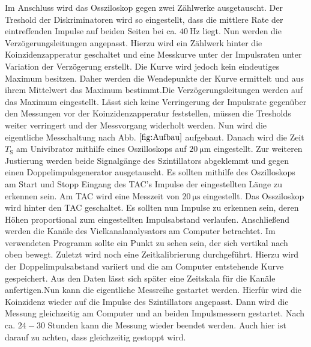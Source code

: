  Im Anschluss wird das Ossziloskop gegen zwei Zählwerke ausgetauscht. Der Treshold der Diskriminatoren wird so eingestellt, dass die mittlere Rate der eintreffenden Impulse auf beiden Seiten bei ca. $\SI{40}{\hertz}$ liegt. Nun werden die Verzögerungsleitungen angepasst. Hierzu wird ein Zählwerk hinter die Koinzidenzapperatur geschaltet und eine Messkurve unter der Impulsraten unter Variation der Verzögerung erstellt. Die Kurve wird jedoch kein eindeutiges Maximum besitzen. Daher werden die Wendepunkte der Kurve ermittelt und aus ihrem Mittelwert das Maximum bestimmt.Die Verzögerungsleitungen werden auf das Maximum eingestellt. Lässt sich keine Verringerung der Impulsrate gegenüber den Messungen vor der Koinzidenzapperatur feststellen, müssen die Tresholds weiter verringert und der Messvorgang widerholt werden. Nun wird die eigentliche Messchaltung nach Abb. $\ref{fig:Aufbau}$ aufgebaut. Danach wird die Zeit $T_\text{S}$ am Univibrator mithilfe eines Oszilloskops auf $\SI{20}{\micro\meter}$ eingestellt. Zur weiteren Justierung werden beide Signalgänge des Szintillators abgeklemmt und gegen einen Doppelimpulsgenerator ausgetauscht. Es sollten mithilfe des Oszilloskops am Start und Stopp Eingang des TAC's Impulse der eingestellten Länge zu erkennen sein. Am TAC wird eine Messzeit von $\SI{20}{\micro\second}$ eingestellt. Das Ossziloskop wird hinter den TAC geschaltet. Es sollten nun Impulse zu erkennen sein, deren Höhen proportional zum eingestellten Impulsabstand verlaufen. Anschließend werden die Kanäle des Vielkanalanalysators am Computer betrachtet. Im verwendeten Programm sollte  ein Punkt zu sehen sein, der sich vertikal nach oben bewegt. Zuletzt wird noch eine Zeitkalibrierung durchgeführt. Hierzu wird der Doppelimpulsabstand variiert und die am Computer entstehende Kurve gespeichert. Aus den Daten lässt sich später eine Zeitskala für die Kanäle anfertigen.Nun kann die eigentliche Messreihe gestartet werden. Hierfür wird die Koinzidenz wieder auf die Impulse des Szintillators angepasst. Dann wird die Messung gleichzeitig am Computer und an beiden Impulsmessern gestartet. Nach ca. $24-30$ Stunden kann die Messung wieder beendet werden. Auch hier ist darauf zu achten, dass gleichzeitig gestoppt wird.  